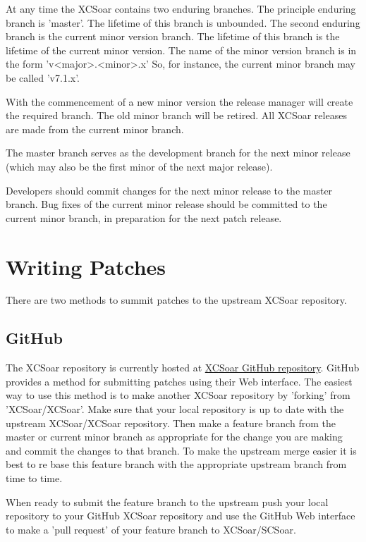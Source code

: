 \documentclass[a4paper,12pt]{refrep}
\begin{document}
At any time the XCSoar contains two enduring branches. The principle
enduring branch is 'master'. The lifetime of this branch is unbounded.
The second enduring branch is the current minor version branch. The
lifetime of this branch is the lifetime of the current minor version.
The name of the minor version branch is in the form 'v<major>.<minor>.x'
So, for instance, the current minor branch may be called 'v7.1.x'.

With the commencement of a new minor version the release manager will
create the required branch. The old minor branch will be retired.
All XCSoar releases are made from the current minor branch.

The master branch serves as the development branch for the next minor
release (which may also be the first minor of the next major release).

Developers should commit changes for the next minor release to the master
branch. Bug fixes of the current minor release should be committed to
the current minor branch, in preparation for the next patch release.

\section{Writing Patches}

There are two methods to summit patches to the upstream XCSoar repository.

\subsection{GitHub}
The XCSoar repository is currently hosted at
\href{https://github.com/XCSoar/XCSoar}{XCSoar GitHub repository}.
GitHub provides a method for submitting patches using their Web interface.
The easiest way to use this method is to make another XCSoar repository by
 'forking' from 'XCSoar/XCSoar'. Make sure that your local repository
is up to date with the upstream XCSoar/XCSoar repository. Then make a 
feature branch from the master or current minor branch as appropriate for
the change you are making and commit the changes to that branch. To make
the upstream merge easier it is best to re base this feature branch with
the appropriate upstream branch from time to time.

When ready to submit the feature branch to the upstream push your local
repository to your GitHub XCSoar repository and use the GitHub Web interface
to make a 'pull request' of your feature branch to XCSoar/SCSoar.
\end{document}
